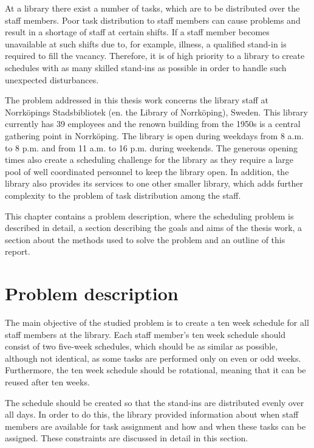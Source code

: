 
At a library there exist a number of tasks, which are to be distributed over the staff members. Poor task distribution to staff members can cause problems and result in a shortage of staff at certain shifts. If a staff member becomes unavailable at such shifts due to, for example, illness, a qualified stand-in is required to fill the vacancy. Therefore, it is of high priority to a library to create schedules with as many skilled stand-ins as possible in order to handle such unexpected disturbances. 

The problem addressed in this thesis work concerns the library staff at Norrköpings Stadsbibliotek (en. the Library of Norrköping), Sweden. This library currently has 39 employees and the renown building from the 1950s is a central gathering point in Norrköping. The library is open during weekdays from 8 a.m. to 8 p.m. and from 11 a.m. to 16 p.m. during weekends. The generous opening times also create a scheduling challenge for the library as they require a large pool of well coordinated personnel to keep the library open. In addition, the library also provides its services to one other smaller library, which adds further complexity to the problem of task distribution among the staff.

This chapter contains a problem description, where the scheduling problem is described in detail, a section describing the goals and aims of the thesis work, a section about the methods used to solve the problem and an outline of this report.

\section{Problem description} \label{problem_description}

The main objective of the studied problem is to create a ten week schedule for all staff members at the library. Each staff member's ten week schedule should consist of two five-week schedules, which should be as similar as possible, although not identical, as some tasks are performed only on even or odd weeks. Furthermore, the ten week schedule should be rotational, meaning that it can be reused after ten weeks.

The schedule should be created so that the stand-ins are distributed evenly over all days. In order to do this, the library provided information about when staff members are available for task assignment and how and when these tasks can be assigned. These constraints are discussed in detail in this section.

